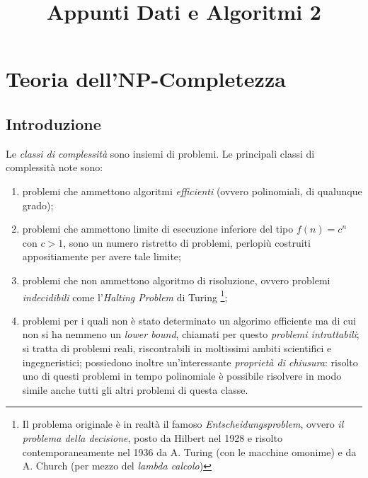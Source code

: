 \documentclass[a4paper,portrait,12pt]{article}
\theoremstyle{definition}
\begin{document}
\title{Appunti Dati e Algoritmi 2}

\maketitle
\date
\newpage

\tableofcontents
\newpage


\section{Teoria dell'NP-Completezza}


\subsection{Introduzione} 

Le \textit{classi di complessità} sono insiemi di problemi. Le principali classi di complessità 
note sono:
\begin{enumerate}
\item problemi che ammettono algoritmi \textit{efficienti} (ovvero polinomiali, di qualunque grado);
\item problemi che ammettono limite di esecuzione inferiore del tipo $f(n) = c^n$ con $c > 1$, sono un numero ristretto
	di problemi, perlopiù costruiti appositiamente per avere tale limite;
\item problemi che non ammettono algoritmo di risoluzione, ovvero problemi \textit{indecidibili} come l'\textit{Halting 
	Problem} di Turing \footnote{Il problema originale è in realtà il famoso \textit{Entscheidungsproblem}, ovvero 
	\textit{il problema della decisione}, posto da Hilbert nel 1928 e risolto contemporaneamente nel 1936 da A. Turing
 	(con le macchine omonime) e da A. Church (per mezzo del \textit{lambda calcolo})};
\item problemi per i quali non è stato determinato un algorimo efficiente ma di cui non si ha nemmeno un \textit{lower 
	bound}, chiamati per questo \textit{problemi intrattabili}; si tratta di problemi reali, riscontrabili in 
	moltissimi ambiti scientifici e ingegneristici; possiedono inoltre un'interessante \textit{proprietà di 
	chiusura}: risolto uno di questi problemi in tempo polinomiale è possibile risolvere in modo simile anche tutti
	gli altri problemi di questa classe.
\end{enumerate} 
\end{document}
